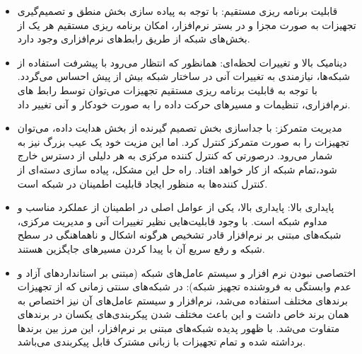 \begin{itemize}
	\item
قابلیت برنامه ریزی مستقیم: با توجه به پیاده سازی بخش منطق و تصمیم‌گیری تجهیزات به صورت مجزا و در بستر نرم‌افزار، امکان برنامه ریزی مستقیم هر یک از بخش‌های شبکه از طریق رابط‌های نرم‌افزاری وجود دارد.
	\item 
دینامیک بالا و تغییرات لحظه‌ای: همانظور که انتظار می‌رود با پیشرفت استفاده از شبکه‌ها، نیازمندی به تغییرات آنی در ساختار شبکه بیش از پیش احساس می‌گردد. با توجه به قابلیت برنامه ریزی مستقیم تجهیزات می‌توان توسط رابط های نرم‌افزاری، تنظیمات و مسیر‌های حرکت داده را به صورت خودکار و آنی تغییر داد.
	\item 
مدیریت متمرکز: با جداسازی بخش تصمیم گیرنده از بخش هدایت داده، می‌توان تجهیزات را به صورت متمرکز کنترل کرد. اما این مزیت خود یک عیب بزرگ نیز به شمار می‌رود. درصورتی که کنترل کننده مرکزی به هر دلیلی از دسترس خارج شود،‌تمام شبکه از کار خواهد افتاد. راه حل این مشکل، پیاده سازی دسته‌ای از کنترل کننده‌ها به منظور ایجاد قابلیت اطمینان در شبکه است.
	\item
پایداری بالا: پایداری بالا، یکی از عوامل اصلی در اطمینان از عملکرد مناسب و مداوم شبکه است. با وجود قابلیت‌هایی نظیر تغییرات آنی و مدیریت مرکزی، شبکه‌های مبتنی بر نرم‌افزار قادر تشخیص هرگونه اشکال و ناهماهنگی در سطح شبکه و رفع سریع آن با پیدا کردن مسیر‌های جایگزین هستند.
	\item 
اختصاصی نبودن نرم افزار و سیستم عامل‌های شبکه (مبتنی بر استاندارد‌های آزاد و عدم وابستگی به فروشنده تجهیز شبکه): در شبکه‌های سنتی زمانی که از تجهیزات برند‌های مختلف استفاده می‌شد، نرم‌افزار و سیستم عامل‌های آن نیز اختصاص به همان برند خاص داشت و این باعث مختلف شدن پیکربندی‌های یکسان در برند‌های متفاوت می‌شد. با ظهور پدیده شبکه‌های مبتنی بر نرم‌افزار، این مرز بین برند‌ها برداشته شده و تمام تجهیزات با زبانی مشترک قابل پیکربندی می‌باشد.
\end{itemize}

